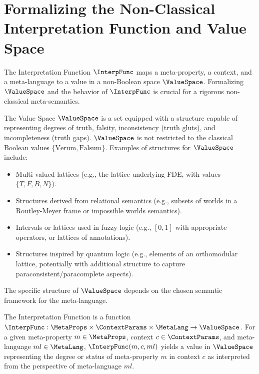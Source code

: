	\section{Formalizing the Non-Classical Interpretation Function and Value Space}
	
	The Interpretation Function $\InterpFunc$ maps a meta-property, a context, and a meta-language to a value in a non-Boolean space $\ValueSpace$. Formalizing $\ValueSpace$ and the behavior of $\InterpFunc$ is crucial for a rigorous non-classical meta-semantics.
	
	\begin{definition}
		The Value Space $\ValueSpace$ is a set equipped with a structure capable of representing degrees of truth, falsity, inconsistency (truth gluts), and incompleteness (truth gaps). $\ValueSpace$ is not restricted to the classical Boolean values $\{\text{Verum}, \text{Falsum}\}$. Examples of structures for $\ValueSpace$ include:
		\begin{itemize}[wide, labelwidth=!, labelindent=0pt, before=\RaggedRight, after=\RaggedRight] %
			\item Multi-valued lattices (e.g., the lattice underlying FDE, with values $\{T, F, B, N\}$).
			\item Structures derived from relational semantics (e.g., subsets of worlds in a Routley-Meyer frame or impossible worlds semantics).
			\item Intervals or lattices used in fuzzy logic (e.g., $[0,1]$ with appropriate operators, or lattices of annotations).
			\item Structures inspired by quantum logic (e.g., elements of an orthomodular lattice, potentially with additional structure to capture paraconsistent/paracomplete aspects).
			\end{itemize}
				The specific structure of $\ValueSpace$ depends on the chosen semantic framework for the meta-language.
				\end{definition}
					
					\begin{definition}
						The Interpretation Function is a function $\InterpFunc: \MetaProps \times \ContextParams \times \MetaLang \rightarrow \ValueSpace$. For a given meta-property $m \in \MetaProps$, context $c \in \ContextParams$, and meta-language $ml \in \MetaLang$, $\InterpFunc(m, c, ml)$ yields a value in $\ValueSpace$ representing the degree or status of meta-property $m$ in context $c$ as interpreted from the perspective of meta-language $ml$.
					\end{definition}
					
